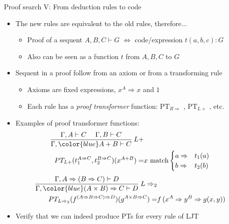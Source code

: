 \documentclass[english]{beamer}
\begin{document}
\begin{frame}{Proof search V: From deduction rules to code}

\begin{itemize}
\item The new rules are equivalent to the old rules, therefore...
\begin{itemize}
\item Proof of a sequent $A,B,C\vdash G$ $\Leftrightarrow$ code/expression
$t(a,b,c):G$
\item Also can be seen as a function $t$ from $A,B,C$ to $G$
\end{itemize}
\item Sequent in a proof follow from an axiom or from a transforming rule
\begin{itemize}
\item Axioms are fixed expressions, $x^{A}\Rightarrow x$ and $1$
\item Each rule has a \emph{proof transformer} function: $\text{PT}_{R\Rightarrow}$
, $\text{PT}_{L+}$ , etc.
\end{itemize}
\item Examples of proof transformer functions:
\begin{align*}
\frac{\Gamma,A\vdash C\quad\;\Gamma,B\vdash C}{\Gamma,{\color{blue}A+B}\vdash C}\:L+\\
PT_{L+}(t_{1}^{A\Rightarrow C},t_{2}^{B\Rightarrow C})(x^{A+B})= & x\ \text{match}\begin{cases}
a\Rightarrow & t_{1}(a)\\
b\Rightarrow & t_{2}(b)
\end{cases}
\end{align*}
\begin{align*}
\frac{\Gamma,A\Rightarrow(B\Rightarrow C)\vdash D}{\Gamma,{\color{blue}(A\times B)\Rightarrow C}\vdash D}\:L\Rightarrow_{2}\\
PT_{L\Rightarrow_{2}}(f^{\left(A\Rightarrow B\Rightarrow C\right)\Rightarrow D})(g^{A\times B\Rightarrow C})= & f\,(x^{A}\Rightarrow y^{B}\Rightarrow g(x,y))
\end{align*}
\item Verify that we can indeed produce PTs for every rule of LJT
\end{itemize}
\end{frame}
\end{document}
